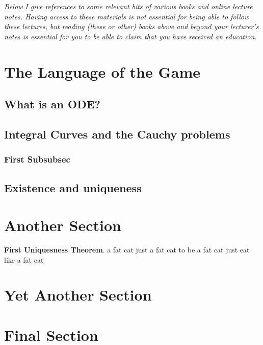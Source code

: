 \documentclass[twoside,a4paper,12pt]{article} %
\begin{document}
\noindent\makebox[\linewidth]{\rule{\linewidth}{0.4pt}}
\begin{center}
\parbox{1\textwidth}{
\emph{Below I give references to some relevant bits of various books and online lecture notes. Having access to these materials is not essential for being able to follow these lectures, but reading (these or other) books above and beyond your lecturer’s notes is essential for you to be able to claim that you have received an education.}
}
\end{center}
\noindent\makebox[\linewidth]{\rule{\linewidth}{0.4pt}}
\tableofcontents

\newpage
\begin{flushright}
    \blindtext[1]
\end{flushright}

\section{The Language of the Game}



\subsection{What is an ODE?}



\subsection{Integral Curves and the Cauchy problems}
\subsubsection{First Subsubsec}


\subsection{Existence and uniqueness}

\section{Another Section}
\lipsum[1]
\begin{center}
	\parbox{0.8\textwidth}{
	\textbf{First Uniquesness Theorem}. a fat cat just a fat cat to be a fat cat just eat like a fat cat
	}
\end{center}
\section{Yet Another Section}
\section{Final Section}

\newpage

\lipsum[1]
\end{document}
